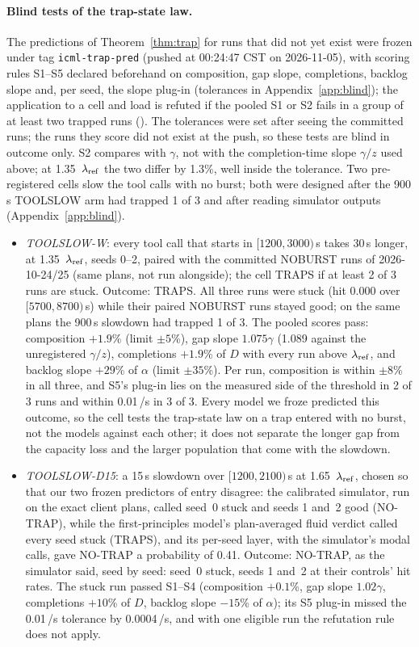 \paragraph{Blind tests of the trap-state law.} The predictions of Theorem~\ref{thm:trap} for runs that did not yet exist were frozen
under tag \texttt{icml-trap-pred} (pushed at 00:24:47 CST on 2026-11-05), with scoring rules S1--S5 declared beforehand on
composition, gap slope, completions, backlog slope and, per seed, the slope plug-in (tolerances in Appendix~\ref{app:blind}); the
application to a cell and load is refuted if the pooled S1 or S2 fails in a group of at least two trapped runs
(). The tolerances were set after seeing the committed runs; the runs they score did not exist
at the push, so these tests are blind in outcome only. S2 compares with $\gamma$, not with the completion-time slope $\gamma/z$ used
above; at 1.35~$\lambda_{\mathrm{ref}}$ the two differ by 1.3\%, well inside the tolerance. Two pre-registered cells slow the tool calls with no burst; both were designed
after the 900\,s TOOLSLOW arm had trapped 1 of 3 and after reading simulator outputs (Appendix~\ref{app:blind}).
\begin{itemize}[leftmargin=*,nosep]
\item \emph{TOOLSLOW-W}: every tool call that starts in $[1200,3000)$\,s takes 30\,s longer, at 1.35~$\lambda_{\mathrm{ref}}$, seeds 0--2, paired
with the committed NOBURST runs of 2026-10-24/25 (same plans, not run alongside); the cell TRAPS if at least 2 of 3 runs are stuck. Outcome: TRAPS. All three runs were stuck (hit
0.000 over $[5700,8700)$\,s) while their paired NOBURST runs stayed good; on the same plans the 900\,s slowdown had trapped 1 of 3. The pooled scores pass: composition $+1.9$\% (limit $\pm5$\%), gap
slope $1.075\gamma$ (1.089 against the unregistered $\gamma/z$), completions $+1.9$\% of $D$ with every run above $\lambda_{\mathrm{ref}}$, and backlog slope $+29$\% of $\alpha$ (limit
$\pm35$\%). Per run, composition is within $\pm8$\% in all three, and S5's plug-in lies on the measured side of the threshold in 2 of
3 runs and within 0.01\,/s in 3 of 3. Every model we froze predicted this outcome, so the cell tests the trap-state law on a trap
entered with no burst, not the models against each other; it does not separate the longer gap from the capacity loss and the larger
population that come with the slowdown.
\item \emph{TOOLSLOW-D15}: a 15\,s slowdown over $[1200,2100)$\,s at 1.65~$\lambda_{\mathrm{ref}}$, chosen so that our two frozen predictors of entry
disagree: the calibrated simulator, run on the exact client plans, called seed~0 stuck and seeds 1 and~2 good (NO-TRAP), while the
first-principles model's plan-averaged fluid verdict called every seed stuck (TRAPS), and its per-seed layer, with the simulator's
modal calls, gave NO-TRAP a probability of 0.41. Outcome: NO-TRAP, as the simulator said, seed by seed: seed~0 stuck, seeds 1 and~2
at their controls' hit rates. The stuck run passed S1--S4 (composition $+0.1$\%, gap slope $1.02\gamma$, completions $+10$\% of
$D$, backlog slope $-15$\% of $\alpha$); its S5 plug-in missed the 0.01\,/s tolerance by 0.0004\,/s, and with one eligible run the
refutation rule does not apply.
\end{itemize}
